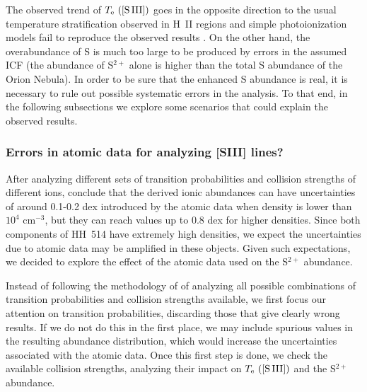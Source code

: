 \documentclass[fleqn,usenatbib]{mnras}
\begin{document}
The observed trend of $T_{\rm e} \text{ ([S\thinspace III])}$ goes in the opposite direction to the usual temperature stratification observed in H~II regions and simple photoionization models fail to reproduce the observed results \citep[][]{Binette2012}. On the other hand, the overabundance of S is much too large to be produced by errors in the assumed ICF (the abundance of S$^{2+}$ alone is higher than the total S abundance of the Orion Nebula).
In order to be sure that the enhanced S abundance is real,
it is necessary to rule out possible systematic errors in the analysis.
To that end, in the following subsections we explore some scenarios that could explain the observed results.

\subsubsection{Errors in    atomic data for analyzing [S\thinspace III] lines?}
\label{subsec:atomic_data}

After analyzing different sets of transition probabilities and collision strengths of different ions, \citet{Juan-de-Dios17} conclude that the derived ionic abundances can have uncertainties of around 0.1-0.2 dex introduced by the atomic data when density is lower than $10^4$ cm$^{-3}$, but they can reach values up to 0.8 dex for higher densities. Since both components of HH~514 have extremely high densities, we expect the uncertainties due to atomic data may be amplified in these objects. Given such expectations, we decided to explore the effect of the atomic data used on the S$^{2+}$ abundance.

Instead of following the methodology of  \citet{Juan-de-Dios17} of analyzing all possible combinations of transition probabilities and collision strengths available, we first focus our attention on transition probabilities, discarding those that give clearly wrong results. If we do not do this in the first place, we may include spurious values in the resulting abundance distribution, which would increase the uncertainties associated with the atomic data. Once this first step is done, we  check the available collision strengths, analyzing their impact on $T_{\rm e} \text{ ([S\thinspace III])}$ and the S$^{2+}$ abundance.

\end{document}
